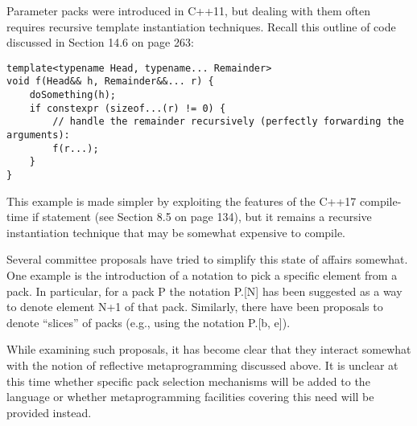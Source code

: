 Parameter packs were introduced in C++11, but dealing with them often requires recursive template instantiation techniques. Recall this outline of code discussed in Section 14.6 on page 263:

\begin{lstlisting}[style=styleCXX]
template<typename Head, typename... Remainder>
void f(Head&& h, Remainder&&... r) {
	doSomething(h);
	if constexpr (sizeof...(r) != 0) {
		// handle the remainder recursively (perfectly forwarding the arguments):
		f(r...);
	}
}
\end{lstlisting}

This example is made simpler by exploiting the features of the C++17 compile-time if statement (see Section 8.5 on page 134), but it remains a recursive instantiation technique that may be somewhat expensive to compile.

Several committee proposals have tried to simplify this state of affairs somewhat. One example is the introduction of a notation to pick a specific element from a pack. In particular, for a pack P the notation P.[N] has been suggested as a way to denote element N+1 of that pack. Similarly, there have been proposals to denote “slices” of packs (e.g., using the notation P.[b, e]).

While examining such proposals, it has become clear that they interact somewhat with the notion of reflective metaprogramming discussed above. It is unclear at this time whether specific pack selection mechanisms will be added to the language or whether metaprogramming facilities covering this need will be provided instead.




















































